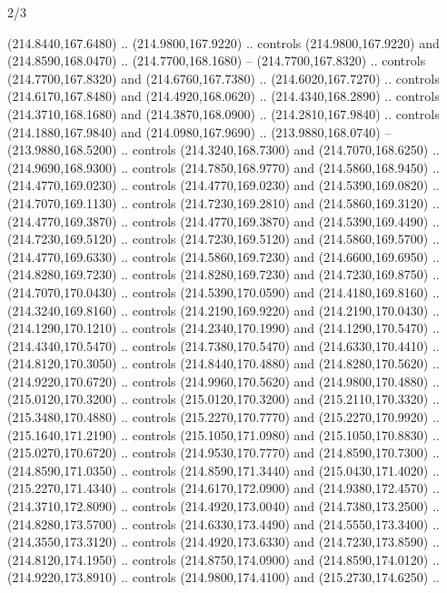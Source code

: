 \begin{flagdescription}{2/3}
\begin{scope}[xshift=0.5\flaglength,yshift=0.5\flagwidth,scale=\flagwidth/259.2]
\begin{scope}[y=0.8pt, x=0.8pt, yscale=-1,shift={(-243,-162)}]
      (214.8440,167.6480) .. (214.9800,167.9220) .. controls (214.9800,167.9220) and
      (214.8590,168.0470) .. (214.7700,168.1680) -- (214.7700,167.8320) .. controls
      (214.7700,167.8320) and (214.6760,167.7380) .. (214.6020,167.7270) .. controls
      (214.6170,167.8480) and (214.4920,168.0620) .. (214.4340,168.2890) .. controls
      (214.3710,168.1680) and (214.3870,168.0900) .. (214.2810,167.9840) .. controls
      (214.1880,167.9840) and (214.0980,167.9690) .. (213.9880,168.0740) --
      (213.9880,168.5200) .. controls (214.3240,168.7300) and (214.7070,168.6250) ..
      (214.9690,168.9300) .. controls (214.7850,168.9770) and (214.5860,168.9450) ..
      (214.4770,169.0230) .. controls (214.4770,169.0230) and (214.5390,169.0820) ..
      (214.7070,169.1130) .. controls (214.7230,169.2810) and (214.5860,169.3120) ..
      (214.4770,169.3870) .. controls (214.4770,169.3870) and (214.5390,169.4490) ..
      (214.7230,169.5120) .. controls (214.7230,169.5120) and (214.5860,169.5700) ..
      (214.4770,169.6330) .. controls (214.5860,169.7230) and (214.6600,169.6950) ..
      (214.8280,169.7230) .. controls (214.8280,169.7230) and (214.7230,169.8750) ..
      (214.7070,170.0430) .. controls (214.5390,170.0590) and (214.4180,169.8160) ..
      (214.3240,169.8160) .. controls (214.2190,169.9220) and (214.2190,170.0430) ..
      (214.1290,170.1210) .. controls (214.2340,170.1990) and (214.1290,170.5470) ..
      (214.4340,170.5470) .. controls (214.7380,170.5470) and (214.6330,170.4410) ..
      (214.8120,170.3050) .. controls (214.8440,170.4880) and (214.8280,170.5620) ..
      (214.9220,170.6720) .. controls (214.9960,170.5620) and (214.9800,170.4880) ..
      (215.0120,170.3200) .. controls (215.0120,170.3200) and (215.2110,170.3320) ..
      (215.3480,170.4880) .. controls (215.2270,170.7770) and (215.2270,170.9920) ..
      (215.1640,171.2190) .. controls (215.1050,171.0980) and (215.1050,170.8830) ..
      (215.0270,170.6720) .. controls (214.9530,170.7770) and (214.8590,170.7300) ..
      (214.8590,171.0350) .. controls (214.8590,171.3440) and (215.0430,171.4020) ..
      (215.2270,171.4340) .. controls (214.6170,172.0900) and (214.9380,172.4570) ..
      (214.3710,172.8090) .. controls (214.4920,173.0040) and (214.7380,173.2500) ..
      (214.8280,173.5700) .. controls (214.6330,173.4490) and (214.5550,173.3400) ..
      (214.3550,173.3120) .. controls (214.4920,173.6330) and (214.7230,173.8590) ..
      (214.8120,174.1950) .. controls (214.8750,174.0900) and (214.8590,174.0120) ..
      (214.9220,173.8910) .. controls (214.9800,174.4100) and (215.2730,174.6250) ..

\end{scope}
\end{scope}
\end{flagdescription}
